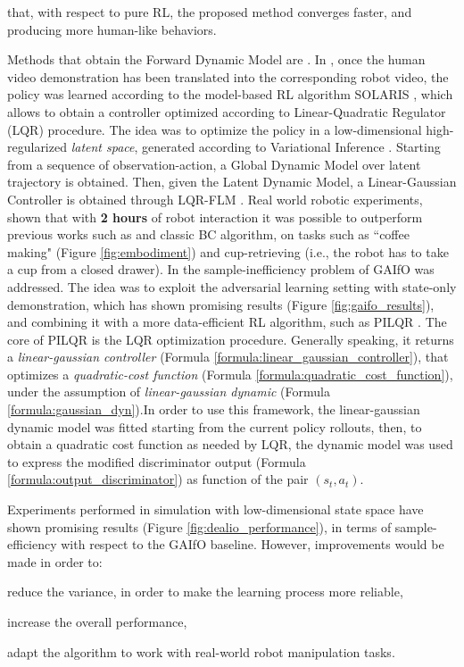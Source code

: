 that, with respect to pure RL, the proposed method converges faster, and producing more human-like behaviors.

\newline Methods that obtain the Forward Dynamic Model are \cite{smith2019avid,torabi2021dealio}. In \cite{smith2019avid}, once the human video demonstration has been translated into the corresponding robot video, the policy was learned according to the model-based RL algorithm SOLARIS \cite{zhang2019solar}, which allows to obtain a controller optimized according to Linear-Quadratic Regulator (LQR) procedure. The idea was to optimize the policy in a low-dimensional high-regularized \textit{latent space}, generated according to Variational Inference \cite{Kingma2014_vae}. Starting from a sequence of observation-action, a Global Dynamic Model over latent trajectory is obtained. Then, given the Latent Dynamic Model, a Linear-Gaussian Controller is obtained through LQR-FLM \cite{levine2014lqr_flm}. Real world robotic experiments, shown that with \textbf{2 hours} of robot interaction it was possible to outperform previous works such as \cite{sermanet2018time_contrastive,torabi2018bco} and classic BC algorithm, on tasks such as ``coffee making" (Figure \ref{fig:embodiment}) and cup-retrieving (i.e., the robot has to take a cup from a closed drawer). 
In \cite{torabi2021dealio} the sample-inefficiency problem of GAIfO \cite{torabi2018gaifo} was addressed. The idea was to exploit the adversarial learning setting with state-only demonstration, which has shown promising results (Figure \ref{fig:gaifo_results}), and combining it with a more data-efficient RL algorithm, such as PILQR \cite{chebotar2017pilqr}. The core of PILQR is the LQR optimization procedure. Generally speaking, it returns a \textit{linear-gaussian controller} (Formula \ref{formula:linear_gaussian_controller}), that optimizes a \textit{quadratic-cost function} (Formula \ref{formula:quadratic_cost_function}), under the assumption of \textit{linear-gaussian dynamic} (Formula \ref{formula:gaussian_dyn}).\noindent In order to use this framework, the linear-gaussian dynamic model was fitted starting from the current policy rollouts, then, to obtain a quadratic cost function as needed by LQR, the dynamic model was used to express the modified discriminator output (Formula \ref{formula:output_discriminator}) as function of the pair $(s_{t},a_{t})$.

Experiments performed in simulation with low-dimensional state space have shown promising results (Figure \ref{fig:dealio_performance}), in terms of sample-efficiency with respect to the GAIfO baseline. However, improvements would be made in order to: \begin{enumerate*}[label=\textbf{(\arabic*)}]
    \item reduce the variance, in order to make the learning process more reliable,
    \item increase the overall performance,
    \item adapt the algorithm to work with real-world robot manipulation tasks.
\end{enumerate*}


